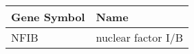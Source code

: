 \begin{tabular}{ll}
\toprule
Gene Symbol &               Name \\
\midrule
       NFIB & nuclear factor I/B \\
\bottomrule
\end{tabular}
